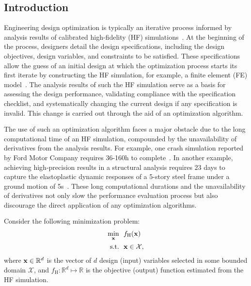 \documentclass[iicol,sn-basic]{sn-jnl}%
\theoremstyle{thmstyleone}%
\theoremstyle{thmstyletwo}
\theoremstyle{thmstylethree}
\begin{document}
\maketitle
\tableofcontents
\begin{linenumbers}

\section{Introduction}\label{Sec1}

Engineering design optimization is typically an iterative process informed by analysis results of calibrated high-fidelity (HF) simulations~\citep{Arora2016,Kochenderfer2019}.
At the beginning of the process, designers detail the design specifications, including the design objectives, design variables, and constraints to be satisfied.
These specifications allow the guess of an initial design at which the optimization process starts its first iterate by constructing the HF simulation, for example, a finite element (FE) model~\citep{Bathe2006}.
The analysis results of such the HF simulation serve as a basis for assessing the design performance, validating compliance with the specification checklist, and systematically changing the current design if any specification is invalid.
This change is carried out through the aid of an optimization algorithm.

The use of such an optimization algorithm faces a major obstacle due to the long computational time of an HF simulation, compounded by the unavailability of derivatives from the analysis results.
For example, one crash simulation reported by Ford Motor Company requires 36-160h to complete~\citep{Wang2006}.
In another example, achieving high-precision results in a structural analysis requires 23 days to capture the elastoplastic dynamic responses of a 5-story steel frame under a ground motion of 5s~\citep{Ohsaki2009}. These long computational durations and the unavailability of derivatives not only slow the performance evaluation process but also discourage the direct application of any optimization algorithms.  

Consider the following minimization problem:
\begin{equation}\label{Eq1}
	\begin{aligned}
		\underset{\bf x}{\min} \ \ & f_\text{H}(\bf x)\\
		\textrm{s.t.} \ \ 
		& \bf x \in \mathcal{X}, 
	\end{aligned}
\end{equation} 
where ${\bf x} \in \mathbb{R}^d$ is the vector of $d$ design (input) variables selected in some bounded domain $\mathcal{X}$, and $f_\text{H}:\mathbb{R}^d \mapsto \mathbb{R}$ is the objective (output) function estimated from the HF simulation.


\end{linenumbers}
\end{document}
